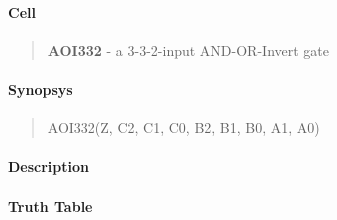 \label{AOI332}
\paragraph{Cell}
\begin{quote}
    \textbf{AOI332} - a 3-3-2-input AND-OR-Invert gate
\end{quote}

\paragraph{Synopsys}
\begin{quote}
    AOI332(Z, C2, C1, C0, B2, B1, B0, A1, A0)
\end{quote}

\paragraph{Description}



\paragraph{Truth Table}


